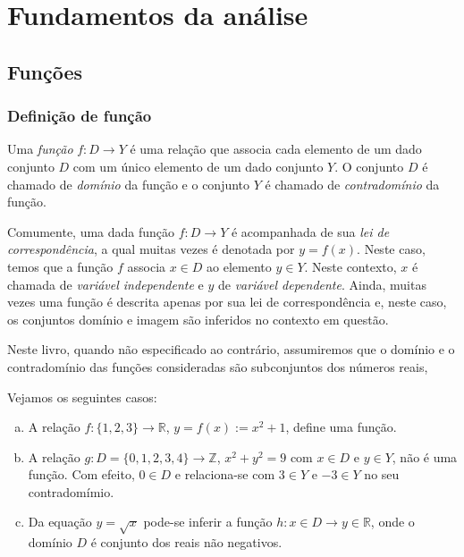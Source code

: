 
\chapter{Fundamentos da análise}\label{cap_fundamentos}
\thispagestyle{fancy}

\section{Funções}\label{cap_fundamentos_sec_funs}

\subsection{Definição de função}

\begin{defn}
  Uma \emph{função} $f:D \to Y$ é uma relação que associa cada elemento de um dado conjunto $D$ com um único elemento de um dado conjunto $Y$. O conjunto $D$ é chamado de \emph{domínio} da função e o conjunto $Y$ é chamado de \emph{contradomínio} da função.
\end{defn}

Comumente, uma dada função $f:D\to Y$ é acompanhada de sua \emph{lei de correspondência}, a qual muitas vezes é denotada por $y = f(x)$. Neste caso, temos que a função $f$ associa $x\in D$ ao elemento $y\in Y$. Neste contexto, $x$ é chamada de \emph{variável independente} e $y$ de \emph{variável dependente}. Ainda, muitas vezes uma função é descrita apenas por sua lei de correspondência e, neste caso, os conjuntos domínio e imagem são inferidos no contexto em questão.

\begin{obs}
  Neste livro, quando não especificado ao contrário, assumiremos que o domínio e o contradomínio das funções consideradas são subconjuntos dos números reais,
\end{obs}

\begin{ex} Vejamos os seguintes casos:
  \begin{enumerate}[a)]
  \item A relação $f:\{1,2,3\}\to\mathbb{R}$, $y = f(x) := x^2 + 1$, define uma função.
  \item A relação $g:D=\{0,1,2,3,4\}\to\mathbb{Z}$, $x^2 + y^2 = 9$ com $x\in D$ e $y\in Y$, não é uma função. Com efeito, $0\in D$ e relaciona-se com $3\in Y$ e $-3\in Y$ no seu contradomímio.
  \item Da equação $y = \sqrt{x}$ pode-se inferir a função $h:x\in D \to y\in\mathbb{R}$, onde o domínio $D$ é conjunto dos reais não negativos.
  \end{enumerate}
\end{ex}

